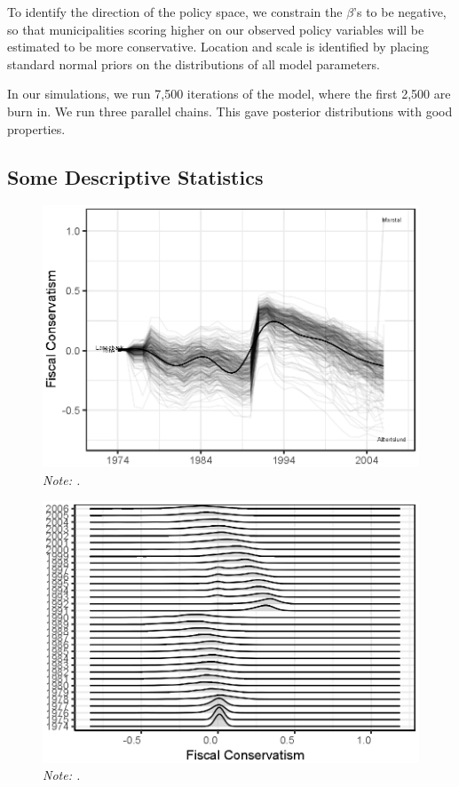 \documentclass[a4paper,12pt]{article}
\newcommand\fnote[1]{\captionsetup{font=small}\caption*{#1}}
\begin{document}
To identify the direction of the policy space, we constrain the $\beta$'s to be negative, so that municipalities scoring higher on our observed policy variables will be estimated to be more conservative. Location and scale is identified by placing standard normal priors on the distributions of all model parameters.

In our simulations, we run 7,500 iterations of the model, where the first 2,500 are burn in. We run three parallel chains. This gave posterior distributions with good properties.



\subsection{Some Descriptive Statistics}

\begin{figure}[!htb]
	\centering
	\includegraphics[scale = .85]{times_lines_inflation_adjusted.eps}
	\caption{\textbf{.}} \fnote{\emph{Note: .}}
	\label{fig:PermTest}
\end{figure}


\begin{figure}[!htb]
	\centering
	\includegraphics[scale = .85]{JoyPlotFiscal_inflation_adjusted.eps}
	\caption{\textbf{.}} \fnote{\emph{Note: .}}
	\label{fig:PermTest}
\end{figure}
\end{document}
